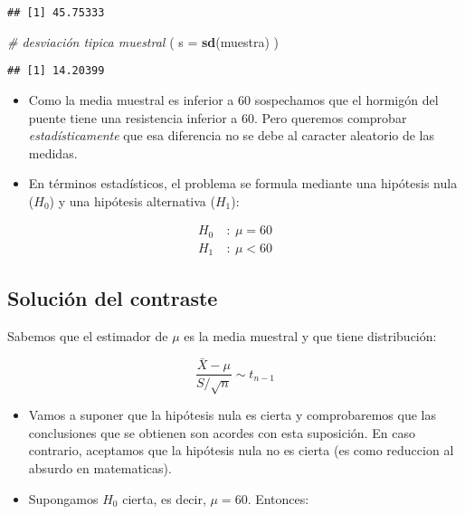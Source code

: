 \documentclass[]{article}
\newenvironment{Shaded}{\begin{snugshade}}{\end{snugshade}}
\newcommand{\KeywordTok}[1]{\textcolor[rgb]{0.13,0.29,0.53}{\textbf{#1}}}
\newcommand{\DataTypeTok}[1]{\textcolor[rgb]{0.13,0.29,0.53}{#1}}
\newcommand{\CommentTok}[1]{\textcolor[rgb]{0.56,0.35,0.01}{\textit{#1}}}
\newcommand{\NormalTok}[1]{#1}
\begin{document}
\begin{verbatim}
## [1] 45.75333
\end{verbatim}

\begin{Shaded}
\begin{Highlighting}[]
\CommentTok{# desviación tipica muestral}
\NormalTok{( }\DataTypeTok{s =} \KeywordTok{sd}\NormalTok{(muestra) )}
\end{Highlighting}
\end{Shaded}

\begin{verbatim}
## [1] 14.20399
\end{verbatim}

\begin{itemize}
\item
  Como la media muestral es inferior a 60 sospechamos que el hormigón
  del puente tiene una resistencia inferior a 60. Pero queremos
  comprobar \emph{estadísticamente} que esa diferencia no se debe al
  caracter aleatorio de las medidas.
\item
  En términos estadísticos, el problema se formula mediante una
  hipótesis nula (\(H_0\)) y una hipótesis alternativa (\(H_1\)):
\end{itemize}

\[
\begin{align}
H_0 \ & : \ \mu = 60 \\
H_1 \ & : \ \mu < 60
\end{align}
\]

\subsection{Solución del contraste}\label{solucion-del-contraste}

Sabemos que el estimador de \(\mu\) es la media muestral y que tiene
distribución:

\[
\frac{\bar X - \mu}{S/\sqrt{n}} \sim t_{n-1}
\]

\begin{itemize}
\item
  Vamos a suponer que la hipótesis nula es cierta y comprobaremos que
  las conclusiones que se obtienen son acordes con esta suposición. En
  caso contrario, aceptamos que la hipótesis nula no es cierta (es como
  reduccion al absurdo en matematicas).
\item
  Supongamos \(H_0\) cierta, es decir, \(\mu = 60\). Entonces:
\end{itemize}
\end{document}
